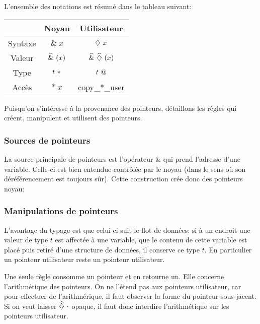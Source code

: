 L'ensemble des notations est résumé dans le tableau suivant:

\begin{center}
\begin{tabular}{ccc}
\toprule
        & Noyau        & Utilisateur \\
\midrule
Syntaxe & $\&~x$       & $\eTaint{x}$ \\
Valeur  & $\wphi{(x)}$ & $\wphi{\vTainted{(x)}}$ \\
Type    & $\ptrK{t}$   & $\ptrU{t}$ \\
Accès   & $*~x$        & copy\_*\_user \\
\bottomrule
\end{tabular}
\end{center}

Puisqu'on s'intéresse à la provenance des pointeurs, détaillons les règles qui
créent, manipulent et utilisent des pointeurs.

\subsubsection*{Sources de pointeurs}

La source principale de pointeurs est l'opérateur $\&$ qui prend l'adresse d'une
variable. Celle-ci est bien entendue contrôlée par le noyau (dans le sens où son
déréférencement est toujours sûr). Cette construction crée donc des pointeurs
noyau:

\begin{mathpar}
\end{mathpar}

\subsubsection*{Manipulations de pointeurs}

L'avantage du typage est que celui-ci suit le flot de données: si à un endroit
une valeur de type $t$ est affectée à une variable, que le contenu de cette
variable est placé puis retiré d'une structure de données, il conserve ce type
$t$. En particulier un pointeur utilisateur reste un pointeur utilisateur.

Une seule règle consomme un pointeur et en retourne un. Elle concerne
l'arithmétique des pointeurs. On ne l'étend pas aux pointeurs utilisateur, car
pour effectuer de l'arithmérique, il faut observer la forme du pointeur
sous-jacent. Si on veut laisser $\phx\vTainted$ opaque, il faut donc interdire
l'arithmétique sur les pointeurs utilisateur.

